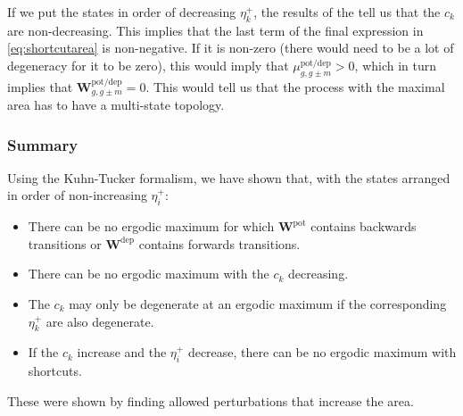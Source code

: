 \documentclass{article} %
\newcommand{\w}{\mathbf{w}}
\newcommand{\W}{\mathbf{W}}
\newcommand{\pot}{^{\text{pot}}}
\newcommand{\dep}{^{\text{dep}}}
\newcommand{\potdep}{^{\text{pot/dep}}}
\begin{document}
If we put the states in order of decreasing $\eta^+_k$, the results of the  tell us that the $c_k$ are non-decreasing.
This implies that the last term of the final expression in \eqref{eq:shortcutarea} is non-negative.
If it is non-zero (there would need to be a lot of degeneracy for it to be zero), this would imply that $\mu\potdep _{g,g\pm m}>0$, which in turn implies that $\W\potdep _{g,g\pm m}=0$.
This would tell us that the process with the maximal area has to have a multi-state topology.


\subsubsection{Summary}\label{sec:KTsummary}

Using the Kuhn-Tucker formalism, we have shown that,
with the states arranged in order of non-increasing $\eta^+_i$:
%
\begin{itemize}
  \item There can be no ergodic maximum for which $\W\pot $ contains backwards transitions or $\W\dep $ contains forwards transitions.
  \item There can be no ergodic maximum with the $c_k$ decreasing.
  \item The $c_k$ may only be degenerate at an ergodic maximum if the corresponding $\eta^+_k$ are also degenerate.
  \item If the $c_k$ increase and the $\eta^+_i$ decrease, there can be no ergodic maximum with shortcuts.
\end{itemize}
%
These were shown by finding allowed perturbations that increase the area.
\end{document}
